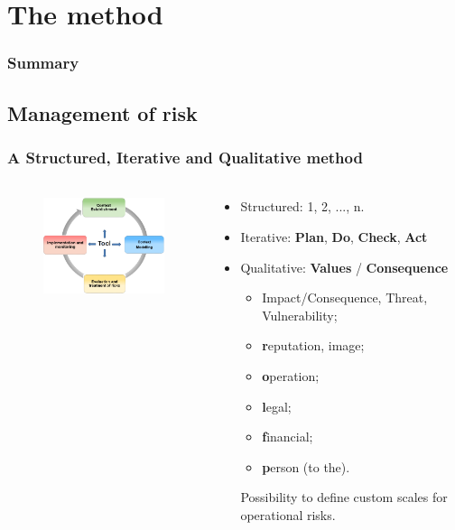 
%
%
\section{The method}
\begin{frame}
  \frametitle{Summary}
\end{frame}


\subsection{Management of risk}
\begin{frame}
  \frametitle{A Structured, Iterative and Qualitative method}
  \framesubtitle{}
  \begin{columns}[t]
    \begin{column}{5.5cm}
      \begin{figure}
        \includegraphics[width=5.5cm]{../common_pictures/MONARC-method-1.png}
      \end{figure}
    \end{column}
    \begin{column}{6.5cm}
      \begin{itemize}
        \item Structured: 1, 2, ..., n.
        \item Iterative: \textbf{Plan}, \textbf{Do}, \textbf{Check}, \textbf{Act}
        \item Qualitative: \textbf{Values} / \textbf{Consequence}
        \begin{itemize}
          \item Impact/Consequence, Threat, Vulnerability;
          \item \textbf{r}eputation, image;
          \item \textbf{o}peration;
          \item \textbf{l}egal;
          \item \textbf{f}inancial;
          \item \textbf{p}erson (to the).
        \end{itemize}
        Possibility to define custom scales for operational risks.
      \end{itemize}
    \end{column}
  \end{columns}
\end{frame}

